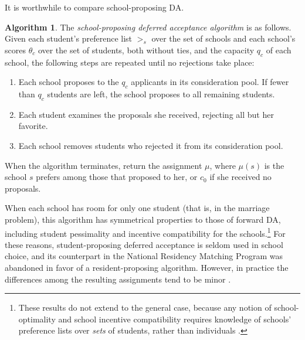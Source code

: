 \documentclass[12pt]{article}
\theoremstyle{definition}
\newtheorem{algorithm}{Algorithm}
\begin{document}
It is worthwhile to compare school-proposing DA. 
\begin{algorithm}
The \emph{school-proposing deferred acceptance algorithm} is as follows. Given each student's preference list $>_s$ over the set of schools and each school's scores $\theta_c$ over the set of students, both without ties, and the capacity $q_c$ of each school, the following steps are repeated until no rejections take place:
\begin{enumerate}
\item Each school proposes to the $q_c$ applicants in its consideration pool. If fewer than $q_c$ students are left, the school proposes to all remaining students.
\item Each student examines the proposals she received, rejecting all but her favorite.
\item Each school removes students who rejected it from its consideration pool.
\end{enumerate}
When the algorithm terminates, return the assignment $\mu$, where $\mu(s)$ is the school $s$ prefers among those that proposed to her, or $c_0$ if she received no proposals.
\end{algorithm}
When each school has room for only one student (that is, in the marriage problem), this algorithm has symmetrical properties to those of forward DA, including student pessimality and incentive compatibility for the schools.\footnote{These results do not extend to the general case, because any notion of school-optimality and school incentive compatibility requires knowledge of schools' preference lists over \emph{sets} of students, rather than individuals \parencite[][]{collegeadmissionsisnotmarriage}.} For these reasons, student-proposing deferred acceptance is seldom used in school choice, and its counterpart in the National Residency Matching Program was abandoned in favor of a resident-proposing algorithm. However, in practice the differences among the resulting assignments tend to be minor \parencite[][]{unbalancedrandommatchingmarkets}. 

\end{document}
